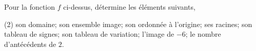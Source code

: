 %
%
    \begin{center}
        
    \end{center}
    Pour la fonction $f$ ci-dessus, détermine les éléments suivants,
    \begin{tasks}(2)
        \task son domaine;
        \task son ensemble image;
        \task son ordonnée à l'origine;
        \task ses racines;
        \task son tableau de signes;
        \task son tableau de variation;
        \task l'image de $-6$;
        \task le nombre d'antécédents de $2$.
    \end{tasks}
